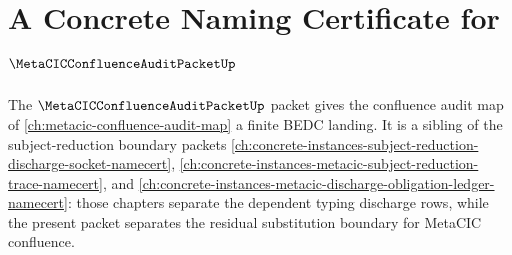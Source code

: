 \chapter{A Concrete Naming Certificate for $\MetaCICConfluenceAuditPacketUp$}
\label{ch:concrete-instances-metacic-confluence-audit-packet-namecert}

The $\MetaCICConfluenceAuditPacketUp$ packet gives the confluence audit map of
\autoref{ch:metacic-confluence-audit-map} a finite BEDC landing. It is a
sibling of the subject-reduction boundary packets
\autoref{ch:concrete-instances-subject-reduction-discharge-socket-namecert},
\autoref{ch:concrete-instances-metacic-subject-reduction-trace-namecert}, and
\autoref{ch:concrete-instances-metacic-discharge-obligation-ledger-namecert}:
those chapters separate the dependent typing discharge rows, while the present
packet separates the residual substitution boundary for MetaCIC confluence.

